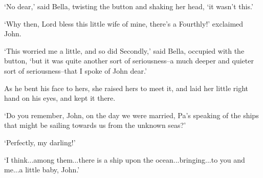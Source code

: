 ‘No dear,’ said Bella, twisting the button and shaking her head, ‘it
wasn’t this.’

‘Why then, Lord bless this little wife of mine, there’s a Fourthly!’
exclaimed John.

‘This worried me a little, and so did Secondly,’ said Bella, occupied
with the button, ‘but it was quite another sort of seriousness--a much
deeper and quieter sort of seriousness--that I spoke of John dear.’

As he bent his face to hers, she raised hers to meet it, and laid her
little right hand on his eyes, and kept it there.

‘Do you remember, John, on the day we were married, Pa’s speaking of the
ships that might be sailing towards us from the unknown seas?’

‘Perfectly, my darling!’

‘I think...among them...there is a ship upon the ocean...bringing...to
you and me...a little baby, John.’



